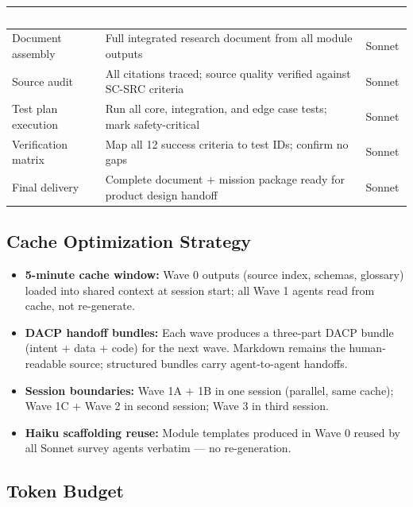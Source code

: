 \documentclass[11pt,letterpaper]{article}
\newcommand{\tableheader}[1]{\textbf{\sffamily\textcolor{white}{#1}}}
\begin{document}
\begin{center}
\begin{tabularx}{\textwidth}{L{4cm}XC{2cm}}
\toprule
{}
\tableheader{Task} & \tableheader{Output} & \tableheader{Model} \\
\midrule
Document assembly & Full integrated research document from all module outputs & Sonnet \\
Source audit & All citations traced; source quality verified against SC-SRC criteria & Sonnet \\
Test plan execution & Run all core, integration, and edge case tests; mark safety-critical & Sonnet \\
Verification matrix & Map all 12 success criteria to test IDs; confirm no gaps & Sonnet \\
Final delivery & Complete document + mission package ready for product design handoff & Sonnet \\
\bottomrule
\end{tabularx}
\end{center}

\subsection{Cache Optimization Strategy}

\begin{itemize}[noitemsep]
  \item \textbf{5-minute cache window:} Wave 0 outputs (source index, schemas, glossary) loaded into shared context at session start; all Wave 1 agents read from cache, not re-generate.
  \item \textbf{DACP handoff bundles:} Each wave produces a three-part DACP bundle (intent + data + code) for the next wave. Markdown remains the human-readable source; structured bundles carry agent-to-agent handoffs.
  \item \textbf{Session boundaries:} Wave 1A + 1B in one session (parallel, same cache); Wave 1C + Wave 2 in second session; Wave 3 in third session.
  \item \textbf{Haiku scaffolding reuse:} Module templates produced in Wave 0 reused by all Sonnet survey agents verbatim --- no re-generation.
\end{itemize}

\subsection{Token Budget}
\end{document}
